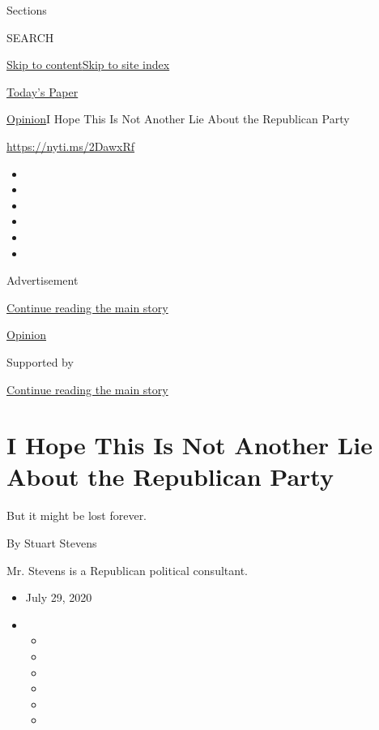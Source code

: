 Sections

SEARCH

\protect\hyperlink{site-content}{Skip to
content}\protect\hyperlink{site-index}{Skip to site index}

\href{https://myaccount.nytimes.com/auth/login?response_type=cookie\&client_id=vi}{}

\href{https://www.nytimes.com/section/todayspaper}{Today's Paper}

\href{/section/opinion}{Opinion}\textbar{}I Hope This Is Not Another Lie
About the Republican Party

\url{https://nyti.ms/2DawxRf}

\begin{itemize}
\item
\item
\item
\item
\item
\item
\end{itemize}

Advertisement

\protect\hyperlink{after-top}{Continue reading the main story}

\href{/section/opinion}{Opinion}

Supported by

\protect\hyperlink{after-sponsor}{Continue reading the main story}

\hypertarget{i-hope-this-is-not-another-lie-about-the-republican-party}{%
\section{I Hope This Is Not Another Lie About the Republican
Party}\label{i-hope-this-is-not-another-lie-about-the-republican-party}}

But it might be lost forever.

By Stuart Stevens

Mr. Stevens is a Republican political consultant.

\begin{itemize}
\item
  July 29, 2020
\item
  \begin{itemize}
  \item
  \item
  \item
  \item
  \item
  \item
  \end{itemize}
\end{itemize}


